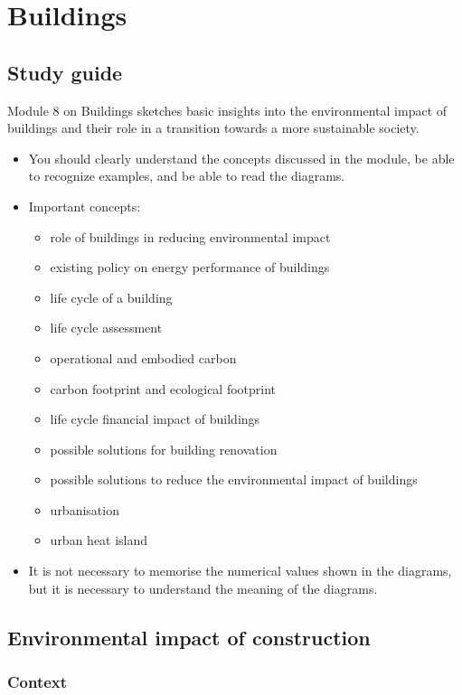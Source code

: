 \documentclass[../summary.tex]{subfiles}
\begin{document}
\section{Buildings}

\subsection{Study guide}

Module 8 on Buildings sketches basic insights into the environmental impact of buildings and their role in a transition towards a more sustainable society.

\begin{itemize}
	\item You should clearly understand the concepts discussed in the module, be able to recognize examples, and be able to read the diagrams.
	\item Important concepts:
	      \begin{itemize}
		      \item role of buildings in reducing environmental impact
		      \item existing policy on energy performance of buildings
		      \item life cycle of a building
		      \item life cycle assessment
		      \item operational and embodied carbon
		      \item carbon footprint and ecological footprint
		      \item life cycle financial impact of buildings
		      \item possible solutions for building renovation
		      \item possible solutions to reduce the environmental impact of buildings
		      \item urbanisation
		      \item urban heat island
	      \end{itemize}
	\item It is not necessary to memorise the numerical values shown in the diagrams, but it is necessary to understand the meaning of the diagrams.
\end{itemize}

\subsection{Environmental impact of construction}
\subsubsection{Context}
\end{document}
